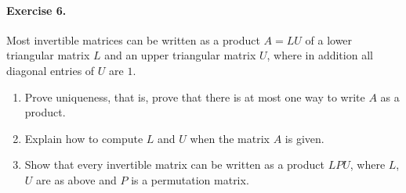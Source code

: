 \documentclass[11pt]{report}
\theoremstyle{remark}
\begin{document}
    \paragraph{Exercise 6.} Most invertible matrices can be written as a product $A
    = LU$ of a lower triangular matrix $L$ and an upper triangular matrix $U$, where
    in addition all diagonal entries of $U$ are $1$.
    \begin{enumerate}
        \itemsep0em
        \item Prove uniqueness, that is, prove that there is at most one way to
        write $A$ as a product.
        \item Explain how to compute $L$ and $U$ when the matrix $A$ is given.
        \item Show that every invertible matrix can be written as a product $LPU$,
        where $L$, $U$ are as above and $P$ is a permutation matrix.
    \end{enumerate}
\end{document}
